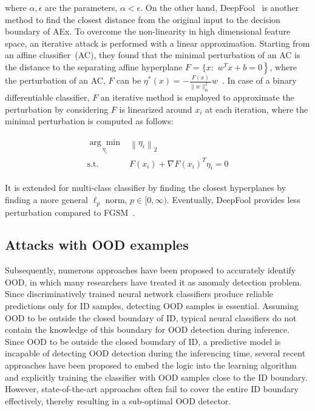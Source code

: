 \hspace*{3.5mm} where $\alpha, \epsilon$ are the parameters, $\alpha<\epsilon$. On the other hand, DeepFool~\cite{moosavi2016deepfool} is another method to find the closest distance from the original input to the decision boundary of AEx. To overcome the non-linearity in high dimensional feature space, an iterative attack is performed with a linear approximation. Starting from an affine classifier~(AC), they found that the minimal perturbation of an AC is the distance to the separating affine hyperplane ${F}=\{x:$ $\left.w^{T} x+b=0\right\}$, where the perturbation of an AC, $F$ can be $\eta^{*}(x)=-\frac{F(x)}{\|w\|_{\text {is }}^{2}} w$~\cite{yuan2019adversarial}. In case of a binary differentiable classifier, $F$ an iterative method is employed to approximate the perturbation by considering $F$ is linearized around $x_{i}$ at each iteration, where the minimal perturbation is computed as follows:
 
\vspace{-6mm}
\begin{align}
    \begin{array}{ll}
    \underset{\eta_{i}}{\arg \min } & \left\|\eta_{i}\right\|_{2} \\
    \text {s.t.} & F\left(x_{i}\right)+\nabla F\left(x_{i}\right)^{T} \eta_{i}=0
    \end{array}
\end{align}

\hspace*{3.5mm} It is extended for multi-class classifier by finding the closest hyperplanes by finding a more general $\ell_{p}$ norm, $p \in[0, \infty)$. Eventually, DeepFool provides less perturbation compared to FGSM~\cite{yuan2019adversarial}.

\subsection{Attacks with OOD examples}
Subsequently, numerous approaches have been proposed to accurately identify OOD, in which many researchers have treated it as anomaly detection problem. Since discriminatively trained neural network classifiers produce reliable predictions only for ID samples, detecting OOD samples is essential. Assuming OOD to be outside the closed boundary of ID, typical neural classifiers do not contain the knowledge of this boundary for OOD detection during inference. Since OOD to be outside the closed boundary of ID, a predictive model is incapable of detecting OOD detection during the inferencing time, several recent approaches have been proposed to embed the logic into the learning algorithm and explicitly training the classifier with OOD samples close to the ID boundary. However, state-of-the-art approaches often fail to cover the entire ID boundary effectively, thereby resulting in a sub-optimal OOD detector. 


